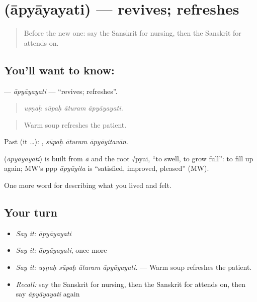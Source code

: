 \section[\texorpdfstring{\sk{आप्याययति} (āpyāyayati)}{आप्याययति (āpyāyayati)}]{ (āpyāyayati) — revives; refreshes}

\label{lesson:SA-C485-apyayayati}



\begin{quote}
Before the new one: say the Sanskrit for nursing, then the Sanskrit for attends on.
\end{quote}

\subsection*{You'll want to know: }
\textbf{} — \emph{āpyāyayati} — \textquotedblleft{}revives; refreshes\textquotedblright{}.

\begin{quote}
   
\end{quote}

\begin{quote}
\emph{uṣṇaḥ sūpaḥ āturam āpyāyayati.}
\end{quote}

\begin{quote}
Warm soup refreshes the patient.
\end{quote}

Past (it …):   , \emph{sūpaḥ āturam āpyāyitavān}.

\begin{cousinweb}
\textbf{} (\emph{āpyāyayati}) is built from \emph{ā} and the root √pyai, \textquotedblleft{}to swell, to grow full\textquotedblright{}: to fill up again; MW's ppp \emph{āpyāyita} is \textquotedblleft{}satisfied, improved, pleased\textquotedblright{} (MW).
\end{cousinweb}

\begin{grammarlens}[title={What you've built}]
One more word for describing what you lived and felt.
\end{grammarlens}

\subsection*{Your turn}
\begin{itemize}
\raggedright
  \item \emph{Say it:} \emph{āpyāyayati}
  \item \emph{Say it:} \emph{āpyāyayati}, once more
  \item \emph{Say it:} \emph{uṣṇaḥ sūpaḥ āturam āpyāyayati.} — Warm soup refreshes the patient.
  \item \emph{Recall:} say the Sanskrit for nursing, then the Sanskrit for attends on, then say \emph{āpyāyayati} again
\end{itemize}

